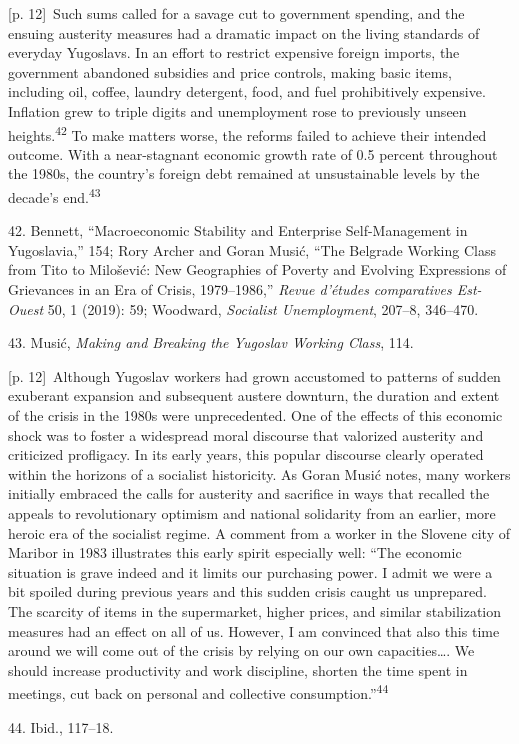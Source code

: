\documentclass[10pt,a4paper]{article}
\begin{document}
{\scriptsize\color{gray} [p. 12]}\ Such sums called for a savage cut to government spending, and the ensuing austerity measures had a dramatic impact on the living standards of everyday Yugoslavs. In an effort to restrict expensive foreign imports, the government abandoned subsidies and price controls, making basic items, including oil, coffee, laundry detergent, food, and fuel prohibitively expensive. Inflation grew to triple digits and unemployment rose to previously unseen heights.\nobreak\textsuperscript{42} To make matters worse, the reforms failed to achieve their intended outcome. With a near-stagnant economic growth rate of 0.5 percent throughout the 1980s, the country’s foreign debt remained at unsustainable levels by the decade’s end.\nobreak\textsuperscript{43}\par{\small 42. Bennett, “Macroeconomic Stability and Enterprise Self-Management in Yugoslavia,” 154; Rory Archer and Goran Musić, “The Belgrade Working Class from Tito to Milošević: New Geographies of Poverty and Evolving Expressions of Grievances in an Era of Crisis, 1979–1986,” \textit{Revue d’études comparatives Est-Ouest} 50, 1 (2019): 59; Woodward, \textit{Socialist Unemployment}, 207–8, 346–470.\par}{\small 43. Musić, \textit{Making and Breaking the Yugoslav Working Class}, 114.\par}
{\scriptsize\color{gray} [p. 12]}\ Although Yugoslav workers had grown accustomed to patterns of sudden exuberant expansion and subsequent austere downturn, the duration and extent of the crisis in the 1980s were unprecedented. One of the effects of this economic shock was to foster a widespread moral discourse that valorized austerity and criticized profligacy. In its early years, this popular discourse clearly operated within the horizons of a socialist historicity. As Goran Musić notes, many workers initially embraced the calls for austerity and sacrifice in ways that recalled the appeals to revolutionary optimism and national solidarity from an earlier, more heroic era of the socialist regime. A comment from a worker in the Slovene city of Maribor in 1983 illustrates this early spirit especially well: “The economic situation is grave indeed and it limits our purchasing power. I admit we were a bit spoiled during previous years and this sudden crisis caught us unprepared. The scarcity of items in the supermarket, higher prices, and similar stabilization measures had an effect on all of us. However, I am convinced that also this time around we will come out of the crisis by relying on our own capacities…. We should increase productivity and work discipline, shorten the time spent in meetings, cut back on personal and collective consumption.”\nobreak\textsuperscript{44}\par{\small 44. Ibid., 117–18.\par}
\end{document}
